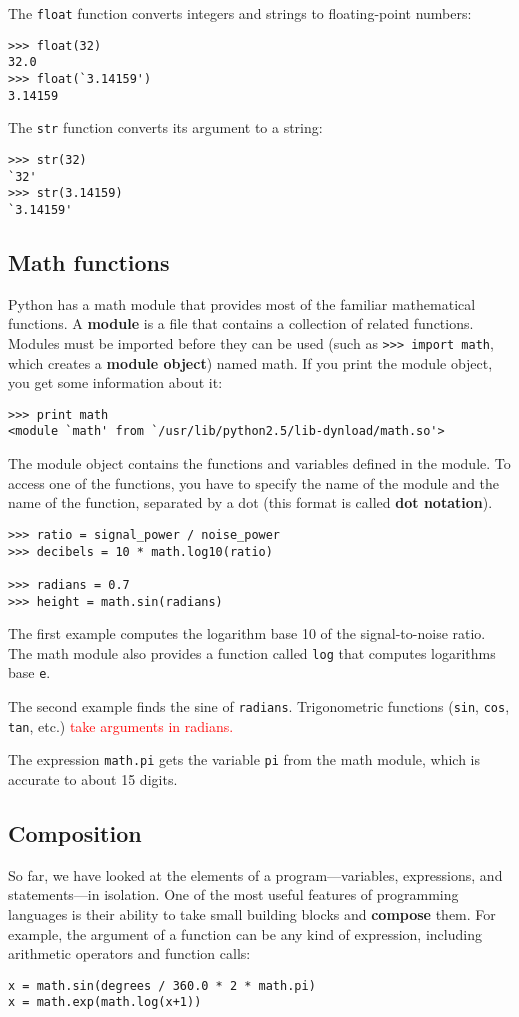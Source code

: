 \documentclass{article}
\begin{document}
The \verb|float| function converts integers and strings to
floating-point numbers:
\begin{verbatim}
>>> float(32)
32.0
>>> float(`3.14159')
3.14159
\end{verbatim}
The \verb|str| function converts its argument to a string:
\begin{verbatim}
>>> str(32)
`32'
>>> str(3.14159)
`3.14159'
\end{verbatim}

\subsection{Math functions}
Python has a math module that provides most of the familiar
mathematical functions. A \textbf{module} is a file that
contains a collection of related functions. Modules must
be imported before they can be used
(such as \verb|>>> import math|, which creates a
\textbf{module object}) named math. If you print the module
object, you get some information about it:
\begin{verbatim}
>>> print math
<module `math' from `/usr/lib/python2.5/lib-dynload/math.so'>
\end{verbatim}
The module object contains the functions and variables defined
in the module. To access one of the functions, you have to specify
the name of the module and the name of the function, separated
by a dot (this format is called \textbf{dot notation}).
\begin{verbatim}
>>> ratio = signal_power / noise_power
>>> decibels = 10 * math.log10(ratio)

>>> radians = 0.7
>>> height = math.sin(radians)
\end{verbatim}
The first example computes the logarithm base 10 of the
signal-to-noise ratio. The math module also provides a function called
\verb|log| that computes logarithms base \verb|e|.

The second example finds the
sine of \verb|radians|.
Trigonometric functions (\verb|sin|, \verb|cos|, \verb|tan|, etc.)
\textcolor{red}{take arguments in radians.}

The expression \verb|math.pi| gets the variable \verb|pi| from
the math module, which is accurate to about 15 digits.

\subsection{Composition}
So far, we have looked at the elements of a program—variables,
expressions, and statements—in
isolation.
One of the most useful features of programming languages is their
ability to take small building
blocks and \textbf{compose} them. For example,
the argument of a function can be any kind of expression,
including arithmetic operators and function calls:
\begin{verbatim}
x = math.sin(degrees / 360.0 * 2 * math.pi)
x = math.exp(math.log(x+1))
\end{verbatim}
\end{document}

